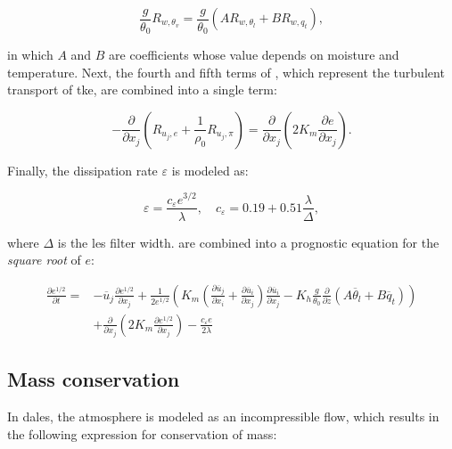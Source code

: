 \begin{equation}
    \frac{g}{\theta_0} R_{w,\theta_v} = \frac{g}{\theta_0} \left( A R_{w,\theta_l} + B R_{w,q_t}\right),
    \label{eq:sfs_buoy}
\end{equation}

in which $A$ and $B$ are coefficients whose value depends on moisture and temperature. Next, the fourth and fifth terms of , which represent the turbulent transport of \acrshort{tke}, are combined into a single term:

\begin{equation}
    - \frac{\partial}{\partial x_j} \left( R_{u_j,e} + \frac{1}{\rho_0} R_{u_j,\pi} \right) = \frac{\partial}{\partial x_j} \left( 2 K_m \frac{\partial e}{\partial x_j} \right).
    \label{eq:sfs_turb}
\end{equation}

Finally, the dissipation rate $\varepsilon$ is modeled as:

\begin{equation}
    \varepsilon = \frac{c_{\varepsilon}e^{3/2}}{\lambda}, \quad c_\varepsilon = 0.19 + 0.51 \frac{\lambda}{\Delta},
    \label{eq:sfs_diss}
\end{equation}

where $\Delta$ is the \acrshort{les} filter width.  are combined into a prognostic equation for the \emph{square root} of $e$:

\begin{equation}
    \begin{split}
        \frac{\partial e^{1/2}}{\partial t} = &- \overline{u}_j \frac{\partial e^{1/2}}{\partial x_j} + \frac{1}{2e^{1/2}} \left( K_m \left( \frac{\partial \overline{u}_j}{\partial x_i} + \frac{\partial \overline{u}_i}{\partial x_j} \right) \frac{\partial \overline{u}_i}{\partial x_j} - K_h \frac{g}{\theta_0} \frac{\partial}{\partial z} \left( A \overline{\theta}_l + B \overline{q}_t\right) \right) \\ &+ \frac{\partial}{\partial x_j} \left( 2 K_m \frac{\partial e^{1/2}}{\partial x_j}\right) - \frac{c_{\varepsilon} e}{2 \lambda}
    \end{split}
    \end{equation}

\subsection{Mass conservation} \label{sec:dales_poisson}
In \acrshort{dales}, the atmosphere is modeled as an incompressible flow, which results in the following expression for conservation of mass:

